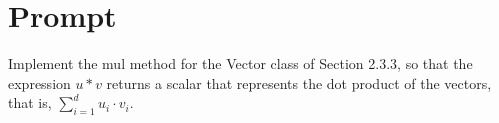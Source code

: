 \documentclass[11pt]{article}
\begin{document}
    \section{Prompt}\label{sec:prompt}

    Implement the mul method for the Vector class of Section 2.3.3, so
that the expression $u \ast v$ returns a scalar that represents the dot product of
the vectors, that is, $\sum_{i = 1}^{d} u_i \cdot v_i$.
\end{document}
